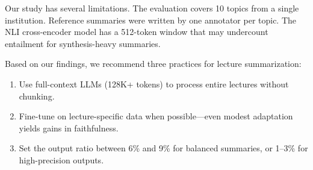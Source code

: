 Our study has several limitations. The evaluation covers 10 topics from a single institution. Reference summaries were written by one annotator per topic. The NLI cross-encoder model has a 512-token window that may undercount entailment for synthesis-heavy summaries.

Based on our findings, we recommend three practices for lecture summarization:
\begin{enumerate}
    \item Use full-context LLMs (128K+ tokens) to process entire lectures without chunking.
    \item Fine-tune on lecture-specific data when possible---even modest adaptation yields gains in faithfulness.
    \item Set the output ratio between 6\% and 9\% for balanced summaries, or 1--3\% for high-precision outputs.
\end{enumerate}
